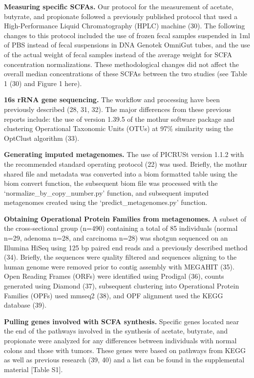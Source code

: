\documentclass[11pt,]{article}
\begin{document}
\textbf{Measuring specific SCFAs.} Our protocol for the measurement of
acetate, butyrate, and propionate followed a previously published
protocol that used a High-Performance Liquid Chromatography (HPLC)
machine (30). The following changes to this protocol included the use of
frozen fecal samples suspended in 1ml of PBS instead of fecal
suspensions in DNA Genotek OmniGut tubes, and the use of the actual
weight of fecal samples instead of the average weight for SCFA
concentration normalizations. These methodological changes did not
affect the overall median concentrations of these SCFAs between the two
studies (see Table 1 (30) and Figure 1 here).

\textbf{16s rRNA gene sequencing.} The workflow and processing have been
previously described (28, 31, 32). The major differences from these
previous reports include: the use of version 1.39.5 of the mothur
software package and clustering Operational Taxonomic Units (OTUs) at
97\% similarity using the OptClust algorithm (33).

\textbf{Generating imputed metagenomes.} The use of PICRUSt version
1.1.2 with the recommended standard operating protocol (22) was used.
Briefly, the mothur shared file and metadata was converted into a biom
formatted table using the biom convert function, the subsequent biom
file was processed with the `normalize\_by\_copy\_number.py' function,
and subsequent imputed metagenomes created using the
`predict\_metagenomes.py' function.

\textbf{Obtaining Operational Protein Families from metagenomes.} A
subset of the cross-sectional group (n=490) containing a total of 85
individuals (normal n=29, adenoma n=28, and carcinoma n=28) was shotgun
sequenced on an Illumina HiSeq using 125 bp paired end reads and a
previously described method (34). Briefly, the sequences were quality
filtered and sequences aligning to the human genome were removed prior
to contig assembly with MEGAHIT (35). Open Reading Frames (ORFs) were
identified using Prodigal (36), counts generated using Diamond (37),
subsequent clustering into Operational Protein Families (OPFs) used
mmseq2 (38), and OPF alignment used the KEGG database (39).

\textbf{Pulling genes involved with SCFA synthesis.} Specific genes
located near the end of the pathways involved in the synthesis of
acetate, butyrate, and propionate were analyzed for any differences
between individuals with normal colons and those with tumors. These
genes were based on pathways from KEGG as well as previous research (39,
40) and a list can be found in the supplemental material {[}Table S1{]}.
\end{document}
